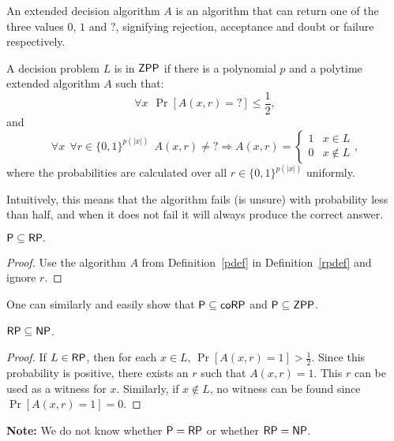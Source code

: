 \begin{definition}
An extended decision algorithm $A$ is an algorithm that can return one of the three values $0$, $1$ and $?$, signifying rejection, acceptance and doubt or failure respectively.
\end{definition}

\begin{definition}\label{zppdef}
A decision problem $L$ is in $\mathsf{ZPP}$ if there is a polynomial $p$ and a polytime extended algorithm $A$ such that:
$$\forall x ~~ \Pr[A(x, r) = ?] \leq \frac{1}{2},$$ and
$$\forall x ~~ \forall r \in \{0, 1\}^{p(\vert x \vert)}  ~~ A(x, r)\neq ? \Rightarrow A(x, r) = \left\{\begin{matrix}
1 & x \in L\\ 
0 & x \not \in L
\end{matrix}\right.,$$
where the probabilities are calculated over all $r \in \{0, 1\}^{p(\vert x \vert)}$ uniformly.

Intuitively, this means that the algorithm fails (is unsure) with probability less than half, and when it does not fail it will always produce the correct answer.
\end{definition}

\begin{proposition}
$\mathsf{P} \subseteq \mathsf{RP}.$
\end{proposition}
\begin{proof}
Use the algorithm $A$ from Definition~\ref{pdef} in Definition~\ref{rpdef} and ignore $r$. 
\end{proof}

One can similarly and easily show that $\mathsf{P} \subseteq \mathsf{coRP}$ and $\mathsf{P} \subseteq \mathsf{ZPP}$.

\begin{proposition}
$\mathsf{RP} \subseteq \mathsf{NP}$.
\end{proposition}
\begin{proof}
If $L \in \mathsf{RP}$, then for each $x \in L$, $\Pr[A(x, r) = 1] > \frac{1}{2}$. Since this probability is positive, there exists an $r$ such that $A(x, r) = 1$. This $r$ can be used as a witness for $x$. Similarly, if $x \not \in L$, no witness can be found since $\Pr[A(x, r) = 1] = 0$.
\end{proof}

\textbf{Note:} We do not know whether $\mathsf{P}=\mathsf{RP}$ or whether $\mathsf{RP}=\mathsf{NP}$. 

